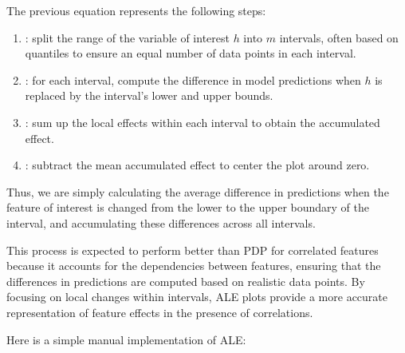 \documentclass[letterpaper,10pt,english]{jupyterBook}
\begin{document}
\sphinxAtStartPar
The previous equation represents the following steps:
\begin{enumerate}
%
\item {} 
\sphinxAtStartPar
{}: split the range of the variable of interest \(h\) into \(m\) intervals, often based on quantiles to ensure an equal number of data points in each interval.

\item {} 
\sphinxAtStartPar
{}: for each interval, compute the difference in model predictions when \(h\) is replaced by the interval’s lower and upper bounds.

\item {} 
\sphinxAtStartPar
{}: sum up the local effects within each interval to obtain the accumulated effect.

\item {} 
\sphinxAtStartPar
{}: subtract the mean accumulated effect to center the plot around zero.

\end{enumerate}

\sphinxAtStartPar
Thus, we are simply calculating the average difference in predictions when the feature of interest is changed from the lower to the upper boundary of the interval, and accumulating these differences across all intervals.

\sphinxAtStartPar
This process is expected to perform better than PDP for correlated features because it accounts for the dependencies between features, ensuring that the differences in predictions are computed based on realistic data points. By focusing on local changes within intervals, ALE plots provide a more accurate representation of feature effects in the presence of correlations.

\sphinxAtStartPar
Here is a simple manual implementation of ALE:
\end{document}
